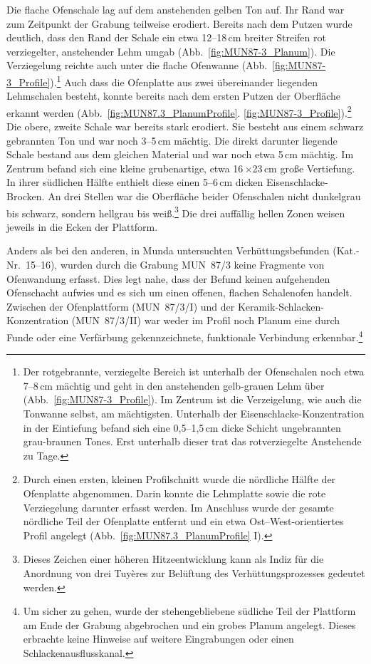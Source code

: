 Die flache Ofenschale lag auf dem anstehenden gelben Ton auf. Ihr Rand war zum Zeitpunkt der Grabung teilweise erodiert. Bereits nach dem Putzen wurde deutlich, dass den Rand der Schale ein etwa 12--18\,cm breiter Streifen rot verziegelter, anstehender Lehm umgab (Abb.~\ref{fig:MUN87-3_Planum}). Die Verziegelung reichte auch unter die flache Ofenwanne (Abb.~\ref{fig:MUN87-3_Profile}).\footnote{Der rotgebrannte, verziegelte Bereich ist unterhalb der Ofenschalen noch etwa 7--8\,cm mächtig und geht in den anstehenden gelb-grauen Lehm über (Abb.~\ref{fig:MUN87-3_Profile}). Im Zentrum ist die Verzeigelung, wie auch die Tonwanne selbst, am mächtigsten. Unterhalb der Eisenschlacke-Konzentration in der Eintiefung befand sich eine 0,5--1,5\,cm dicke Schicht ungebrannten grau-braunen Tones. Erst unterhalb dieser trat das rotverziegelte Anstehende zu Tage.} Auch dass die Ofenplatte aus zwei übereinander liegenden Lehmschalen besteht, konnte bereits nach dem ersten Putzen der Oberfläche erkannt werden (Abb.~\ref{fig:MUN87.3_PlanumProfile}. \ref{fig:MUN87-3_Profile}).\footnote{Durch einen ersten, kleinen Profilschnitt wurde die nördliche Hälfte der Ofenplatte abgenommen. Darin konnte die Lehmplatte sowie die rote Verziegelung darunter erfasst werden. Im Anschluss wurde der gesamte nördliche Teil der Ofenplatte entfernt und ein etwa Ost--West-orientiertes Profil angelegt (Abb.~\ref{fig:MUN87.3_PlanumProfile} I).} Die obere, zweite Schale war bereits stark erodiert. Sie besteht aus einem schwarz gebrannten Ton und war noch 3--5\,cm mächtig. Die direkt darunter liegende Schale bestand aus dem gleichen Material und war noch etwa 5\,cm mächtig. Im Zentrum befand sich eine kleine grubenartige, etwa 16\,$\times$23\,cm große Vertiefung. In ihrer südlichen Hälfte enthielt diese einen 5--6\,cm dicken Eisenschlacke-Brocken. An drei Stellen war die Oberfläche beider Ofenschalen nicht dunkelgrau bis schwarz, sondern hellgrau bis weiß.\footnote{Dieses Zeichen einer höheren Hitzeentwicklung kann als Indiz für die Anordnung von drei Tuyères zur Belüftung des Verhüttungsprozesses gedeutet werden.} Die drei auffällig hellen Zonen weisen jeweils in die Ecken der Plattform.

Anders als bei den anderen, in Munda untersuchten Verhüttungsbefunden (Kat.-Nr.~15--16), wurden durch die Grabung MUN~87/3 keine Fragmente von Ofenwandung erfasst. Dies legt nahe, dass der Befund keinen aufgehenden Ofenschacht aufwies und es sich um einen offenen, flachen Schalenofen handelt. Zwischen der Ofenplattform (MUN~87/3/I) und der Keramik-Schlacken-Konzentration (MUN~87/3/II) war weder im Profil noch Planum eine durch Funde oder eine Verfärbung gekennzeichnete, funktionale Verbindung erkennbar.\footnote{Um sicher zu gehen, wurde der stehengebliebene südliche Teil der Plattform am Ende der Grabung abgebrochen und ein grobes Planum angelegt. Dieses erbrachte keine Hinweise auf weitere Eingrabungen oder einen Schlackenausflusskanal.}

